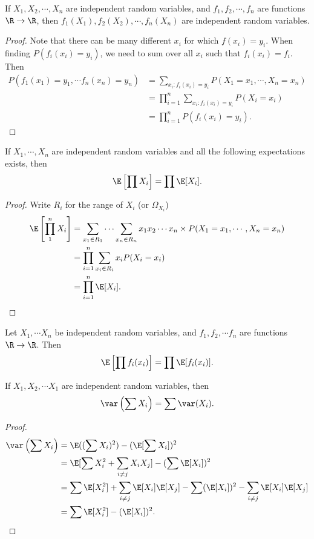 \documentclass[a4paper]{article}
\begin{document}
\begin{thm}
  If $X_1, X_2, \cdots, X_n$ are independent random variables, and $f_1, f_2, \cdots, f_n$ are functions $\R \to \R$, then $f_1(X_1), f_2(X_2), \cdots, f_n(X_n)$ are independent random variables.
\end{thm}

\begin{proof}
  Note that there can be many different $x_i$ for which $f(x_i) = y_i$. When finding $P(f_i(x_i)= y_i)$, we need to sum over all $x_i$ such that $f_i(x_i) = f_i$. Then
  \begin{align*}
    P(f_1(x_1) = y_1, \cdots f_n(x_n) = y_n) &= \sum_{x_i: f_i(x_i) = y_i} P(X_1 = x_1, \cdots, X_n = x_n)\\
    &= \prod_{i = 1}^n \sum_{x_i:f_i(x_i) = y_i} P(X_i = x_i)\\
    &= \prod_{i = 1}^n P(f_i(x_i) = y_i).
  \end{align*}
\end{proof}

\begin{thm}
  If $X_1, \cdots, X_n$ are independent random variables and all the following expectations exists, then
  \[
    \E\left[\prod X_i\right] = \prod \E[X_i].
  \]
\end{thm}

\begin{proof}
  Write $R_i$ for the range of $X_i$ (or $\Omega_{X_i}$)
  \begin{align*}
    \E\left[\prod_1^n X_i\right] &= \sum_{x_1\in R_1}\cdots \sum_{x_n\in R_n}x_1x_2\cdots x_n\times P(X_1 = x_1, \cdots, X_n = x_n)\\
    &= \prod_{i = 1}^n \sum_{x_i \in R_i}x_iP(X_i = x_i)\\
    &= \prod_{i = 1}^n \E[X_i].
  \end{align*}
\end{proof}

\begin{cor}
  Let $X_1,\cdots X_n$ be independent random variables, and $f_1, f_2, \cdots f_n$ are functions $\R\to \R$. Then
  \[
    \E\left[\prod f_i(x_i)\right] = \prod \E[f_i(x_i)].
  \]
\end{cor}

\begin{thm}
  If $X_1, X_2, \cdots X_1$ are independent random variables, then
  \[
    \var\left(\sum X_i\right) = \sum \var (X_i).
  \]
\end{thm}

\begin{proof}
  \begin{align*}
    \var\left(\sum X_i\right) &= \E((\sum X_i)^2) - (\E[\sum X_i])^2\\
    &= \E[\sum X_i^2 + \sum_{i \not =j} X_iX_j] - (\sum\E [X_i])^2\\
    &= \sum \E[X_i^2] + \sum_{i\not= j}\E[X_i]\E[X_j] - \sum(\E[X_i])^2 - \sum_{i\not= j}\E[X_i]\E[X_j]\\
    &= \sum \E[X_i^2] - (\E[X_i])^2.
  \end{align*}
\end{proof}
\end{document}
